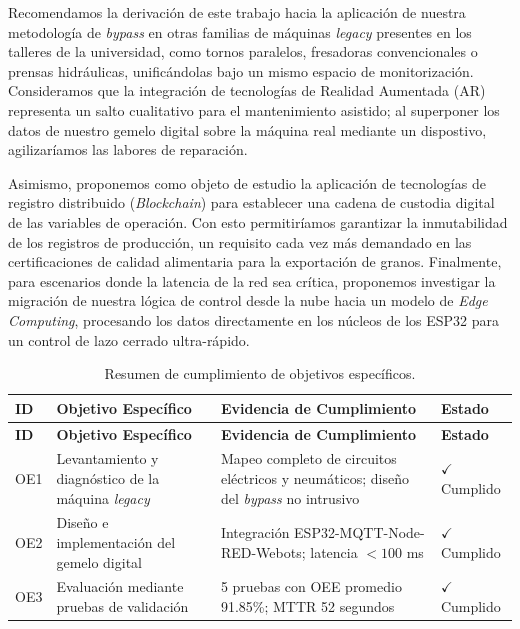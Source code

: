 Recomendamos la derivación de este trabajo hacia la aplicación de nuestra metodología de \textit{bypass} en otras familias de máquinas \textit{legacy} presentes en los talleres de la universidad, como tornos paralelos, fresadoras convencionales o prensas hidráulicas, unificándolas bajo un mismo espacio de monitorización. Consideramos que la integración de tecnologías de Realidad Aumentada (AR) representa un salto cualitativo para el mantenimiento asistido; al superponer los datos de nuestro gemelo digital sobre la máquina real mediante un dispostivo, agilizaríamos las labores de reparación.

Asimismo, proponemos como objeto de estudio la aplicación de tecnologías de registro distribuido (\textit{Blockchain}) para establecer una cadena de custodia digital de las variables de operación. Con esto permitiríamos garantizar la inmutabilidad de los registros de producción, un requisito cada vez más demandado en las certificaciones de calidad alimentaria para la exportación de granos. Finalmente, para escenarios donde la latencia de la red sea crítica, proponemos investigar la migración de nuestra lógica de control desde la nube hacia un modelo de \textit{Edge Computing}, procesando los datos directamente en los núcleos de los ESP32 para un control de lazo cerrado ultra-rápido.

\begin{longtable}{|p{}|p{}|p{}|p{}|}
\caption{Resumen de cumplimiento de objetivos específicos.}
\label{tab:cumplimiento_objetivos} \\
\hline
\textbf{ID} & \textbf{Objetivo Específico} & \textbf{Evidencia de Cumplimiento} & \textbf{Estado} \\
\hline
\endfirsthead

\hline
\textbf{ID} & \textbf{Objetivo Específico} & \textbf{Evidencia de Cumplimiento} & \textbf{Estado} \\
\hline
\endhead

\hline
\endfoot

\hline
\endlastfoot

OE1 & Levantamiento y diagnóstico de la máquina \textit{legacy} & Mapeo completo de circuitos eléctricos y neumáticos; diseño del \textit{bypass} no intrusivo & $\checkmark$ Cumplido \\
\hline
OE2 & Diseño e implementación del gemelo digital & Integración ESP32-MQTT-Node-RED-Webots; latencia $< 100$ ms & $\checkmark$ Cumplido \\
\hline
OE3 & Evaluación mediante pruebas de validación & 5 pruebas con OEE promedio 91.85\%; MTTR 52 segundos & $\checkmark$ Cumplido \\
\hline
\end{longtable}

